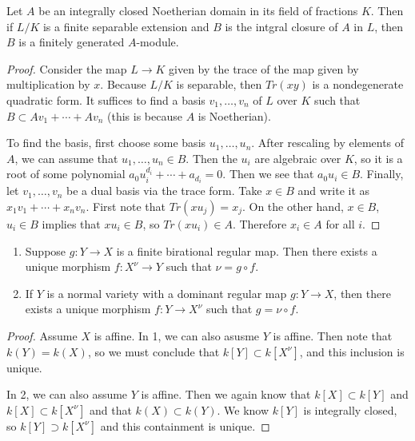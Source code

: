 \documentclass[twoside, 10pt]{article}
\begin{document}
        \begin{lem}
            Let $A$ be an integrally closed Noetherian domain in its field of fractions $K$. Then if $L/K$ is a finite separable extension and $B$ is the intgral closure of $A$ in $L$, then $B$ is a finitely generated $A$-module.
            \begin{proof}
                Consider the map $L \to K$ given by the trace of the map given by multiplication by $x$. Because $L/K$ is separable, then $Tr(xy)$ is a nondegenerate quadratic form. It suffices to find a basis $v_1, \ldots, v_n$ of $L$ over $K$ such that $B \subset A v_1 + \cdots + Av_n$ (this is because $A$ is Noetherian).

                To find the basis, first choose some basis $u_1, \ldots, u_n$. After rescaling by elements of $A$, we can assume that $u_1, \ldots, u_n \in B$. Then the $u_i$ are algebraic over $K$, so it is a root of some polynomial $a_0u_i^{d_i} + \cdots + a_{d_i} = 0$. Then we see that $a_0u_i \in B$. Finally, let $v_1, \ldots, v_n$ be a dual basis via the trace form. Take $x \in B$ and write it as $x_1v_1 + \cdots + x_nv_n$. First note that $Tr(xu_j) = x_j$. On the other hand, $x \in B$, $u_i \in B$ implies that $xu_i \in B$, so $Tr(xu_i) \in A$. Therefore $x_i \in A$ for all $i$.
            \end{proof}
        \end{lem}

        \begin{thm}
            \begin{enumerate}
                \item Suppose $g:Y \to X$ is a finite birational regular map. Then there exists a unique morphism  $f:X^{\nu} \to Y$ such that $\nu = g \circ f$.
                \item If $Y$ is a normal variety with a dominant regular map $g:Y \to X$, then there exists a unique morphism $f:Y \to X^{\nu}$ such that $g = \nu \circ f$.
            \end{enumerate}
        \end{thm}

        \begin{proof}
            Assume $X$ is affine. In 1, we can also asusme $Y$ is affine. Then note that $k(Y) = k(X)$, so we must conclude that $k[Y] \subset k[X^{\nu}]$, and this inclusion is unique.

            In 2, we can also assume $Y$ is affine. Then we again know that $k[X] \subset k[Y]$ and $k[X]\subset k[X^{\nu}]$ and that $k(X) \subset k(Y)$. We know $k[Y]$ is integrally closed, so $k[Y] \supset k[X^{\nu}]$ and this containment is unique.
        \end{proof}
\end{document}
